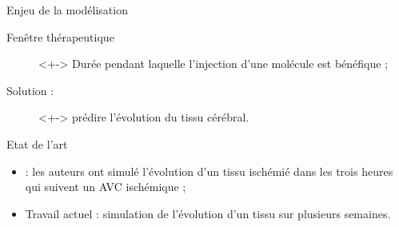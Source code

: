 \begin{frame}
\begin{block}{Enjeu de la mod\'elisation}
\begin{description}
\item[Fen\^etre th\'erapeutique]<+-> Dur\'ee pendant laquelle l'injection d'une mol\'ecule est b\'en\'efique ;
\item[Solution : ]<+-> pr\'edire l'\'evolution du tissu c\'er\'ebral.
\end{description}
\end{block}

\begin{block}{Etat de l'art}
\begin{itemize}
\item<+-> \cite{Duval_JCBFM_02} : les auteurs ont simul\'e l'\'evolution d'un tissu isch\'emi\'e dans les trois heures qui suivent un AVC isch\'emique ;
\item<+-> Travail actuel : simulation de l'\'evolution d'un tissu sur plusieurs semaines.
\end{itemize}
\end{block}
\end{frame}